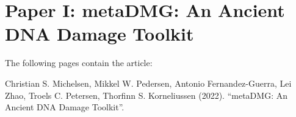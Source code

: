 \chapter{Paper I: metaDMG: An Ancient DNA Damage Toolkit}

The following pages contain the article:
\vspace*{1cm}


Christian S. Michelsen, Mikkel W. Pedersen, Antonio Fernandez-Guerra, Lei Zhao, Troels C. Petersen, Thorfinn S. Korneliussen (2022). ``metaDMG: An Ancient DNA Damage Toolkit''.


\clearpage
